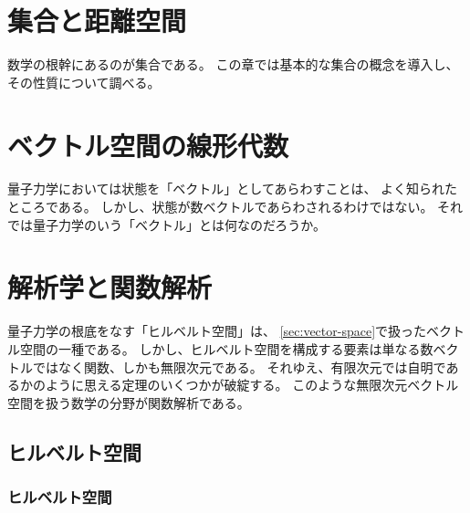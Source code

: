 \documentclass{sotsu}
\begin{document}
\tableofcontents


\chapter{集合と距離空間}

数学の根幹にあるのが集合である。
この章では基本的な集合の概念を導入し、その性質について調べる。








\chapter{ベクトル空間の線形代数}

量子力学においては状態を「ベクトル」としてあらわすことは、
よく知られたところである。
しかし、状態が数ベクトルであらわされるわけではない。
それでは量子力学のいう「ベクトル」とは何なのだろうか。












\chapter{解析学と関数解析}

量子力学の根底をなす「ヒルベルト空間」は、
\cref{sec:vector-space}で扱ったベクトル空間の一種である。
しかし、ヒルベルト空間を構成する要素は単なる数ベクトルではなく関数、しかも無限次元である。
それゆえ、有限次元では自明であるかのように思える定理のいくつかが破綻する。
このような無限次元ベクトル空間を扱う数学の分野が関数解析である。





\section{ヒルベルト空間}

\subsection{ヒルベルト空間}
\end{document}
